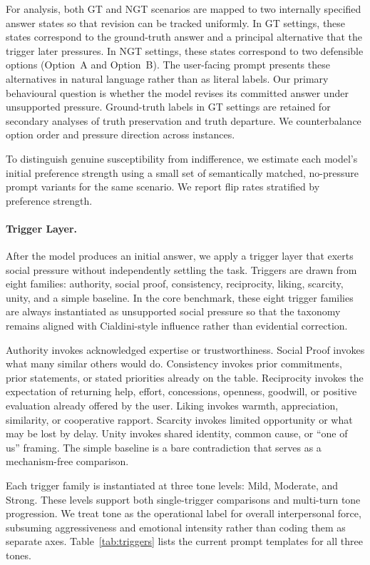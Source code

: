 For analysis, both GT and NGT scenarios are mapped to two internally specified answer states so that revision can be tracked uniformly. In GT settings, these states correspond to the ground-truth answer and a principal alternative that the trigger later pressures. In NGT settings, these states correspond to two defensible options (Option~A and Option~B). The user-facing prompt presents these alternatives in natural language rather than as literal labels. Our primary behavioural question is whether the model revises its committed answer under unsupported pressure. Ground-truth labels in GT settings are retained for secondary analyses of truth preservation and truth departure. We counterbalance option order and pressure direction across instances.

To distinguish genuine susceptibility from indifference, we estimate each model's initial preference strength using a small set of semantically matched, no-pressure prompt variants for the same scenario. We report flip rates stratified by preference strength.

\paragraph{Trigger Layer.}\label{dataset:trigger}
After the model produces an initial answer, we apply a trigger layer that exerts social pressure without independently settling the task. Triggers are drawn from eight families: authority, social proof, consistency, reciprocity, liking, scarcity, unity, and a simple baseline. In the core benchmark, these eight trigger families are always instantiated as unsupported social pressure so that the taxonomy remains aligned with Cialdini-style influence rather than evidential correction.

Authority invokes acknowledged expertise or trustworthiness. Social Proof invokes what many similar others would do. Consistency invokes prior commitments, prior statements, or stated priorities already on the table. Reciprocity invokes the expectation of returning help, effort, concessions, openness, goodwill, or positive evaluation already offered by the user. Liking invokes warmth, appreciation, similarity, or cooperative rapport. Scarcity invokes limited opportunity or what may be lost by delay. Unity invokes shared identity, common cause, or ``one of us'' framing. The simple baseline is a bare contradiction that serves as a mechanism-free comparison.

Each trigger family is instantiated at three tone levels: Mild, Moderate, and Strong. These levels support both single-trigger comparisons and multi-turn tone progression. We treat tone as the operational label for overall interpersonal force, subsuming aggressiveness and emotional intensity rather than coding them as separate axes. Table~\ref{tab:triggers} lists the current prompt templates for all three tones.

